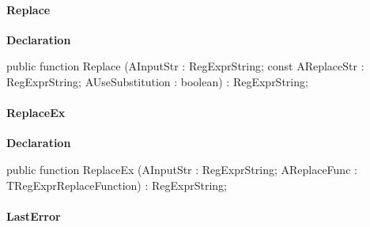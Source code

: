 \documentclass{report}
\newif\ifpdf
\begin{document}
\paragraph*{Replace}\hspace*{\fill}

\label{RegExpr.TRegExpr-Replace}
\begin{list}{}{
\setlength{\itemindent}{0cm}
\setlength{\listparindent}{0cm}
\setlength{\leftmargin}{\evensidemargin}
\addtolength{\leftmargin}{\tmplength}
\settowidth{\labelsep}{X}
\addtolength{\leftmargin}{\labelsep}
\setlength{\labelwidth}{\tmplength}
}
\item[\textbf{Declaration}\hfill]
\ifpdf
\begin{flushleft}
\fi
\begin{ttfamily}
public function Replace (AInputStr : RegExprString; const AReplaceStr : RegExprString; AUseSubstitution : boolean) : RegExprString;\end{ttfamily}

\ifpdf
\end{flushleft}
\fi

\end{list}
\paragraph*{ReplaceEx}\hspace*{\fill}

\label{RegExpr.TRegExpr-ReplaceEx}
\begin{list}{}{
\setlength{\itemindent}{0cm}
\setlength{\listparindent}{0cm}
\setlength{\leftmargin}{\evensidemargin}
\addtolength{\leftmargin}{\tmplength}
\settowidth{\labelsep}{X}
\addtolength{\leftmargin}{\labelsep}
\setlength{\labelwidth}{\tmplength}
}
\item[\textbf{Declaration}\hfill]
\ifpdf
\begin{flushleft}
\fi
\begin{ttfamily}
public function ReplaceEx (AInputStr : RegExprString; AReplaceFunc : TRegExprReplaceFunction) : RegExprString;\end{ttfamily}

\ifpdf
\end{flushleft}
\fi

\end{list}
\paragraph*{LastError}\hspace*{\fill}
\end{document}
